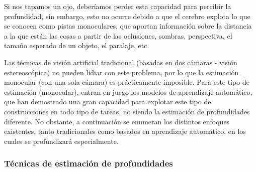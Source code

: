 Si nos tapamos un ojo, deberíamos perder esta capacidad para percibir la profundidad, sin embargo, esto no ocurre debido a que el cerebro explota lo que se conocen como pistas monoculares, que aportan información sobre la distancia a la que están las cosas a partir de las oclusiones, sombras, perspectiva, el tamaño esperado de un objeto, el paralaje, etc.

Las técnicas de visión artificial tradicional (basadas en dos cámaras - visión estereoscópica) no pueden lidiar con este problema, por lo que la estimación monocular (con una sola cámara) es prácticamente imposible. Para este tipo de estimación (monocular), entran en juego los modelos de aprendizaje automático, que han demostrado una gran capacidad para explotar este tipo de construcciones en todo tipo de tareas, no siendo la estimación de profundidades diferente. No obstante, a continuación se enumeran los distintos enfoques existentes, tanto tradicionales como basados en aprendizaje automático, en los cuales se profundizará especialmente.




\subsubsection{Técnicas de estimación de profundidades} \label{estimacion-profundidades-sota}


